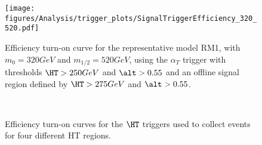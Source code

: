 \begin{figure}[!h]
  \begin{center}
    \texttt{[image: figures/Analysis/trigger\_plots/SignalTriggerEfficiency\_320\_520.pdf]}
    \caption{\label{fig:eff-alphat-sig}Efficiency turn-on curve for the representative model
      RM1, with $m_0=320GeV$ and $m_{1/2}=520GeV$, using the
      $\alpha_{T}$ trigger with thresholds $\HT > 250 GeV$ and
      $\alt > 0.55$ and an offline signal region defined by
      $\HT > 275 GeV$ and $\alt > 0.55$.}
  \end{center}
\end{figure}

\newpage
\begin{figure}[!h]
  \begin{center}
     \\
    \caption{\label{fig:eff-ht-diff}Efficiency turn-on curves for the $\HT$ triggers
      used to collect events for four different HT regions.}
  \end{center}
\end{figure}




